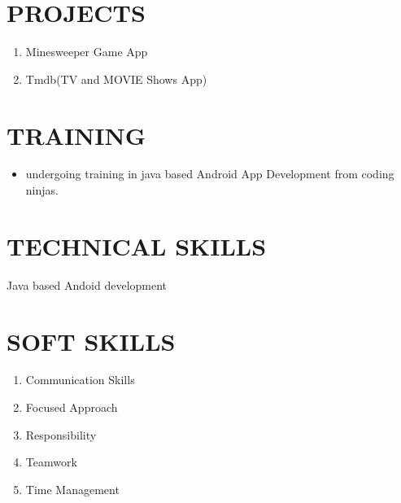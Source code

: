 \documentclass{article}
\begin{document}
\section{PROJECTS}
\Large
\begin{enumerate}
\item Minesweeper Game App
\item Tmdb(TV and MOVIE Shows App) 
\end{enumerate}

\section{TRAINING}
\begin{itemize}
\item undergoing training in java based Android App Development from coding ninjas.
\end{itemize}
\section{TECHNICAL SKILLS}
Java based Andoid development\\

\section{SOFT SKILLS}
\begin{enumerate}
\item Communication Skills\\
\item Focused Approach\\
\item Responsibility\\
\item Teamwork\\
\item  Time Management\\
\end{enumerate}
\end{document}
